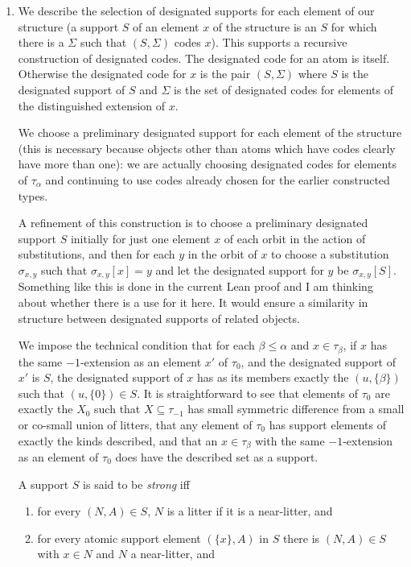 \documentclass[12pt]{article}
\begin{document}
\begin{enumerate}
\item We describe the selection of designated supports for each element of our structure (a support $S$ of an element $x$ of the structure is an $S$ for which there is a $\Sigma$ such that $(S,\Sigma)$ codes $x$).  This supports a recursive construction of designated codes.
The designated code for an atom is itself.  Otherwise the designated code for $x$ is the pair $(S,\Sigma)$ where $S$ is the designated support of $S$ and $\Sigma$ is the set of designated codes for elements of the distinguished extension of $x$.

We choose a preliminary designated support for each element of the structure (this is necessary because objects other than atoms which have codes clearly have more than one):  we are actually
choosing designated codes for elements of $\tau_\alpha$ and continuing to use codes already chosen for the earlier constructed types.

A refinement of this construction is to choose a preliminary designated support $S$ initially for just one element $x$ of each orbit in the action of substitutions, and then for each $y$ in the orbit of $x$ to choose a substitution $\sigma_{x,y}$ such that $\sigma_{x,y}[x]=y$ and let the designated support
for $y$ be $\sigma_{x,y}[S]$.  Something like this is done in the current Lean proof and I am thinking about whether there is a use for it here.  It would ensure a similarity in structure between designated supports of related objects.

We impose the technical condition that for each $\beta \leq \alpha$ and $x \in \tau_\beta$, if $x$ has the same $-1$-extension as an element $x'$  of $\tau_0$, and the designated support of $x'$ is $S$, the designated support of $x$ has as its members exactly the $(u,\{\beta\})$ such that $(u,\{0\}) \in S$.  It is straightforward to see that elements of $\tau_0$ are exactly the $X_0$ such that $X \subseteq \tau_{-1}$ has small symmetric difference from a small or co-small union of litters, that any element of $\tau_0$ has support elements of exactly the kinds described, and that an $x \in \tau_\beta$ with the same $-1$-extension as
an element of $\tau_0$ does have the described set as a support.

A support $S$ is said to be {\em strong\/} iff

\begin{enumerate}

\item for every $(N,A) \in S$, $N$ is a litter if it is a near-litter, and
\item  for every atomic support element $(\{x\},A)$ in $S$ there is $(N,A) \in S$ with $x \in N$ and $N$ a near-litter, and 


\end{enumerate}
\end{enumerate}
\end{document}
